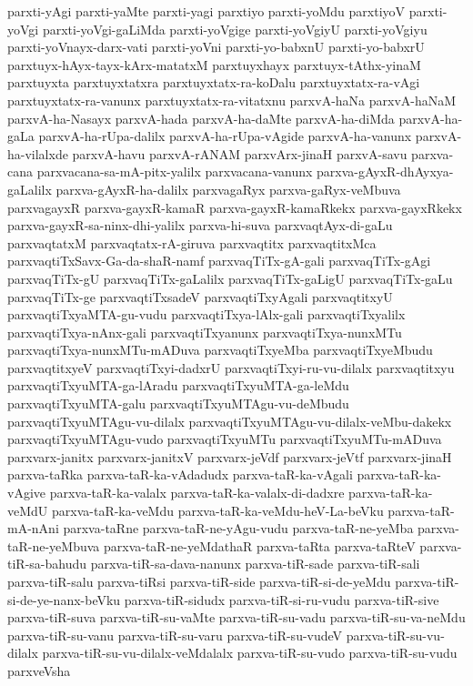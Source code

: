 {parxti-yAgi
parxti-yaMte
parxti-yagi
parxtiyo
parxti-yoMdu
parxtiyoV
parxti-yoVgi
parxti-yoVgi-gaLiMda
parxti-yoVgige
parxti-yoVgiyU
parxti-yoVgiyu
parxti-yoVnayx-darx-vati
parxti-yoVni
parxti-yo-babxnU
parxti-yo-babxrU
parxtuyx-hAyx-tayx-kArx-matatxM
parxtuyxhayx
parxtuyx-tAthx-yinaM
parxtuyxta
parxtuyxtatxra
parxtuyxtatx-ra-koDalu
parxtuyxtatx-ra-vAgi
parxtuyxtatx-ra-vanunx
parxtuyxtatx-ra-vitatxnu
parxvA-haNa
parxvA-haNaM
parxvA-ha-Nasayx
parxvA-hada
parxvA-ha-daMte
parxvA-ha-diMda
parxvA-ha-gaLa
parxvA-ha-rUpa-dalilx
parxvA-ha-rUpa-vAgide
parxvA-ha-vanunx
parxvA-ha-vilalxde
parxvA-havu
parxvA-rANAM
parxvArx-jinaH
parxvA-savu
parxva-cana
parxvacana-sa-mA-pitx-yalilx
parxvacana-vanunx
parxva-gAyxR-dhAyxya-gaLalilx
parxva-gAyxR-ha-dalilx
parxvagaRyx
parxva-gaRyx-veMbuva
parxvagayxR
parxva-gayxR-kamaR
parxva-gayxR-kamaRkekx
parxva-gayxRkekx
parxva-gayxR-sa-ninx-dhi-yalilx
parxva-hi-suva
parxvaqtAyx-di-gaLu
parxvaqtatxM
parxvaqtatx-rA-giruva
parxvaqtitx
parxvaqtitxMca
parxvaqtiTxSavx-Ga-da-shaR-namf
parxvaqTiTx-gA-gali
parxvaqTiTx-gAgi
parxvaqTiTx-gU
parxvaqTiTx-gaLalilx
parxvaqTiTx-gaLigU
parxvaqTiTx-gaLu
parxvaqTiTx-ge
parxvaqtiTxsadeV
parxvaqtiTxyAgali
parxvaqtitxyU
parxvaqtiTxyaMTA-gu-vudu
parxvaqtiTxya-lAlx-gali
parxvaqtiTxyalilx
parxvaqtiTxya-nAnx-gali
parxvaqtiTxyanunx
parxvaqtiTxya-nunxMTu
parxvaqtiTxya-nunxMTu-mADuva
parxvaqtiTxyeMba
parxvaqtiTxyeMbudu
parxvaqtitxyeV
parxvaqtiTxyi-dadxrU
parxvaqtiTxyi-ru-vu-dilalx
parxvaqtitxyu
parxvaqtiTxyuMTA-ga-lAradu
parxvaqtiTxyuMTA-ga-leMdu
parxvaqtiTxyuMTA-galu
parxvaqtiTxyuMTAgu-vu-deMbudu
parxvaqtiTxyuMTAgu-vu-dilalx
parxvaqtiTxyuMTAgu-vu-dilalx-veMbu-dakekx
parxvaqtiTxyuMTAgu-vudo
parxvaqtiTxyuMTu
parxvaqtiTxyuMTu-mADuva
parxvarx-janitx
parxvarx-janitxV
parxvarx-jeVdf
parxvarx-jeVtf
parxvarx-jinaH
parxva-taRka
parxva-taR-ka-vAdadudx
parxva-taR-ka-vAgali
parxva-taR-ka-vAgive
parxva-taR-ka-valalx
parxva-taR-ka-valalx-di-dadxre
parxva-taR-ka-veMdU
parxva-taR-ka-veMdu
parxva-taR-ka-veMdu-heV-La-beVku
parxva-taR-mA-nAni
parxva-taRne
parxva-taR-ne-yAgu-vudu
parxva-taR-ne-yeMba
parxva-taR-ne-yeMbuva
parxva-taR-ne-yeMdathaR
parxva-taRta
parxva-taRteV
parxva-tiR-sa-bahudu
parxva-tiR-sa-dava-nanunx
parxva-tiR-sade
parxva-tiR-sali
parxva-tiR-salu
parxva-tiRsi
parxva-tiR-side
parxva-tiR-si-de-yeMdu
parxva-tiR-si-de-ye-nanx-beVku
parxva-tiR-sidudx
parxva-tiR-si-ru-vudu
parxva-tiR-sive
parxva-tiR-suva
parxva-tiR-su-vaMte
parxva-tiR-su-vadu
parxva-tiR-su-va-neMdu
parxva-tiR-su-vanu
parxva-tiR-su-varu
parxva-tiR-su-vudeV
parxva-tiR-su-vu-dilalx
parxva-tiR-su-vu-dilalx-veMdalalx
parxva-tiR-su-vudo
parxva-tiR-su-vudu
parxveVsha
}
